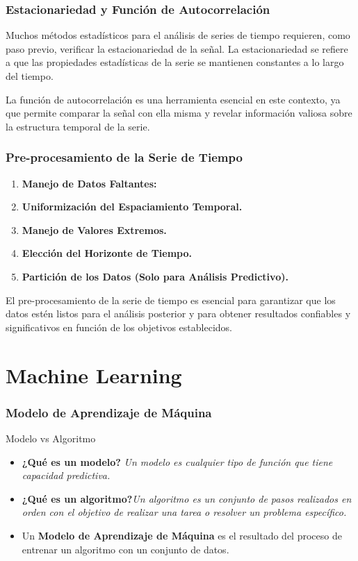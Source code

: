 \documentclass{beamer}
\begin{document}
  \begin{frame}
	\frametitle{Estacionariedad y Función de Autocorrelación}
	Muchos métodos estadísticos para el análisis de series de tiempo requieren, como paso previo, verificar la estacionariedad de la señal. La estacionariedad se refiere a que las propiedades estadísticas de la serie se mantienen constantes a lo largo del tiempo.
	
	La función de autocorrelación es una herramienta esencial en este contexto, ya que permite comparar la señal con ella misma y revelar información valiosa sobre la estructura temporal de la serie.
  \end{frame}
  
  \begin{frame}
	\frametitle{Pre-procesamiento de la Serie de Tiempo}
	\begin{enumerate}
	  \item \textbf{Manejo de Datos Faltantes:} 
	  \item \textbf{Uniformización del Espaciamiento Temporal.}
	  \item \textbf{Manejo de Valores Extremos.}
	  \item \textbf{Elección del Horizonte de Tiempo.}
	  \item \textbf{Partición de los Datos (Solo para Análisis Predictivo).}
	\end{enumerate}
	El pre-procesamiento de la serie de tiempo es esencial para garantizar que los datos estén listos para el análisis posterior y para obtener resultados confiables y significativos en función de los objetivos establecidos.
  \end{frame}
  


\section{Machine Learning}
	
\begin{frame}
	\frametitle{Modelo de Aprendizaje de Máquina}
					\begin{block}{Modelo vs Algoritmo}	
	\begin{itemize}
		\item \textbf{¿Qué es un modelo?} \textit{Un modelo es cualquier tipo de función que tiene capacidad predictiva.}
		\item\textbf{¿Qué es un algoritmo?}\textit{Un algoritmo es un conjunto de pasos realizados en orden  con el objetivo de realizar una tarea o resolver un problema específico.}
		\item Un \textbf{Modelo de Aprendizaje de Máquina} es el resultado del proceso de entrenar un algoritmo con un conjunto de datos.
	\end{itemize}
\end{block}
\end{frame}
	
\end{document}
